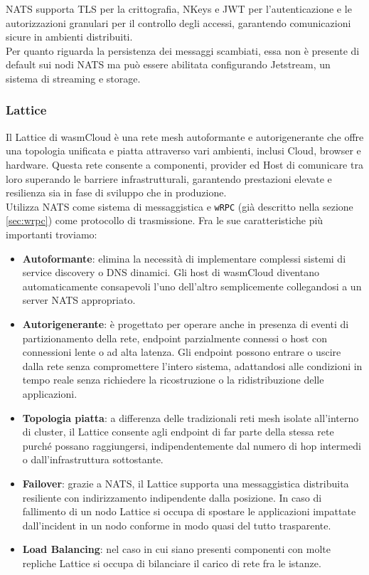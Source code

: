 NATS supporta TLS per la crittografia, NKeys e JWT per l'autenticazione e le autorizzazioni granulari per il controllo degli accessi, garantendo comunicazioni sicure in ambienti distribuiti.\\
Per quanto riguarda la persistenza dei messaggi scambiati, essa non è presente di default sui nodi NATS ma può essere abilitata configurando Jetstream, un sistema di streaming e storage.\\

\subsubsection{Lattice}

Il Lattice di wasmCloud è una rete mesh autoformante e autorigenerante che offre una topologia unificata e piatta attraverso vari ambienti, inclusi Cloud, browser e hardware. Questa rete consente a componenti, provider ed Host di comunicare tra loro superando le barriere infrastrutturali, garantendo prestazioni elevate e resilienza sia in fase di sviluppo che in produzione.\\
Utilizza NATS come sistema di messaggistica e \texttt{wRPC} (già descritto nella sezione \ref{sec:wrpc}) come protocollo di trasmissione. Fra le sue caratteristiche più importanti troviamo:
\begin{itemize}
    \item \textbf{Autoformante}: elimina la necessità di implementare complessi sistemi di service discovery o DNS dinamici. Gli host di wasmCloud diventano automaticamente consapevoli l'uno dell'altro semplicemente collegandosi a un server NATS appropriato.

    \item \textbf{Autorigenerante}: è progettato per operare anche in presenza di eventi di partizionamento della rete, endpoint parzialmente connessi o host con connessioni lente o ad alta latenza. Gli endpoint possono entrare o uscire dalla rete senza compromettere l'intero sistema, adattandosi alle condizioni in tempo reale senza richiedere la ricostruzione o la ridistribuzione delle applicazioni.

    \item \textbf{Topologia piatta}: a differenza delle tradizionali reti mesh isolate all'interno di cluster, il Lattice consente agli endpoint di far parte della stessa rete purché possano raggiungersi, indipendentemente dal numero di hop intermedi o dall'infrastruttura sottostante.

    \item \textbf{Failover}: grazie a NATS, il Lattice supporta una messaggistica distribuita resiliente con indirizzamento indipendente dalla posizione. In caso di fallimento di un nodo Lattice si occupa di spostare le applicazioni impattate dall'incident in un nodo conforme in modo quasi del tutto trasparente.

    \item \textbf{Load Balancing}: nel caso in cui siano presenti componenti con molte repliche Lattice si occupa di bilanciare il carico di rete fra le istanze.

\end{itemize}
